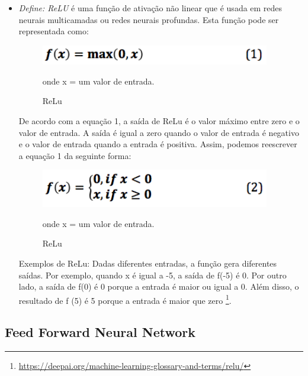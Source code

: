 \begin{itemize}
   \item \textit{Define: ReLU} é uma função de ativação não linear que é usada em redes neurais multicamadas ou redes neurais profundas. Esta função pode ser representada como:

         \begin{figure}[H]
            \begin{center}
               \includegraphics[width=10cm]{img/relu.jpg}
               \caption{ReLu} \label{ReLu}
               \medskip
               \small
               onde x = um valor de entrada.
            \end{center}
         \end{figure}

         De acordo com a equação 1, a saída de ReLu é o valor máximo entre zero e o valor de entrada. A saída é igual a zero quando o valor de entrada é negativo e o valor de entrada quando a entrada é positiva. Assim, podemos reescrever a equação 1 da seguinte forma:

         \begin{figure}[H]
            \begin{center}
               \includegraphics[width=10cm]{img/relu2.jpg}
               \caption{ReLu} \label{ReLu2}
               \medskip
               \small
               onde x = um valor de entrada.
            \end{center}
         \end{figure}


         Exemplos de ReLu: Dadas diferentes entradas, a função gera diferentes saídas. Por exemplo, quando x é igual a -5, a saída de f(-5) é 0. Por outro lado, a saída de f(0) é 0 porque a entrada é maior ou igual a 0. Além disso, o resultado de f (5) é 5 porque a entrada é maior que zero \footnote{\url{https://deepai.org/machine-learning-glossary-and-terms/relu/}}.
\end{itemize}

\subsection[Feed Forward Neural Network]{Feed Forward Neural Network}

